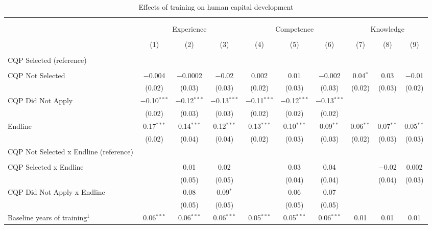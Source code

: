 \documentclass[
  a4paper, twoside, 12pt]{book}
\begin{document}
\begin{singlespacing}

\begin{table}[H] \centering 
  \caption{Effects of training on human capital development} 
  \label{tab:tbl-appreg} 
\scriptsize 
\begin{tabular}{@{\extracolsep{-8pt}}lccccccccc} 
\\[-1.8ex]\hline 
\hline \\[-1.8ex] 
\\[-1.8ex] & \multicolumn{3}{c}{Experience} & \multicolumn{3}{c}{Competence} & \multicolumn{3}{c}{Knowledge} \\ 
\\[-1.8ex] & (1) & (2) & (3) & (4) & (5) & (6) & (7) & (8) & (9)\\ 
\hline \\[-1.8ex] 
 CQP Selected (reference) \\ \\ CQP Not Selected & $-$0.004 & $-$0.0002 & $-$0.02 & 0.002 & 0.01 & $-$0.002 & 0.04$^{*}$ & 0.03 & $-$0.01 \\ 
  & (0.02) & (0.03) & (0.03) & (0.02) & (0.03) & (0.03) & (0.02) & (0.03) & (0.02) \\ 
  CQP Did Not Apply & $-$0.10$^{***}$ & $-$0.12$^{***}$ & $-$0.13$^{***}$ & $-$0.11$^{***}$ & $-$0.12$^{***}$ & $-$0.13$^{***}$ &  &  &  \\ 
  & (0.02) & (0.03) & (0.03) & (0.02) & (0.02) & (0.02) &  &  &  \\ 
  Endline & 0.17$^{***}$ & 0.14$^{***}$ & 0.12$^{***}$ & 0.13$^{***}$ & 0.10$^{***}$ & 0.09$^{**}$ & 0.06$^{**}$ & 0.07$^{**}$ & 0.05$^{**}$ \\ 
  & (0.02) & (0.04) & (0.04) & (0.02) & (0.03) & (0.03) & (0.02) & (0.03) & (0.03) \\ 
  CQP Not Selected x Endline (reference) \\ \\ CQP Selected x Endline &  & 0.01 & 0.02 &  & 0.03 & 0.04 &  & $-$0.02 & 0.002 \\ 
  &  & (0.05) & (0.05) &  & (0.04) & (0.04) &  & (0.04) & (0.03) \\ 
  CQP Did Not Apply x Endline &  & 0.08 & 0.09$^{*}$ &  & 0.06 & 0.07 &  &  &  \\ 
  &  & (0.05) & (0.05) &  & (0.05) & (0.05) &  &  &  \\ 
  Baseline years of training$^1$ & 0.06$^{***}$ & 0.06$^{***}$ & 0.06$^{***}$ & 0.05$^{***}$ & 0.05$^{***}$ & 0.06$^{***}$ & 0.01 & 0.01 & 0.01 \\ 

\end{tabular}
\end{table}
\end{singlespacing}
\end{document}
